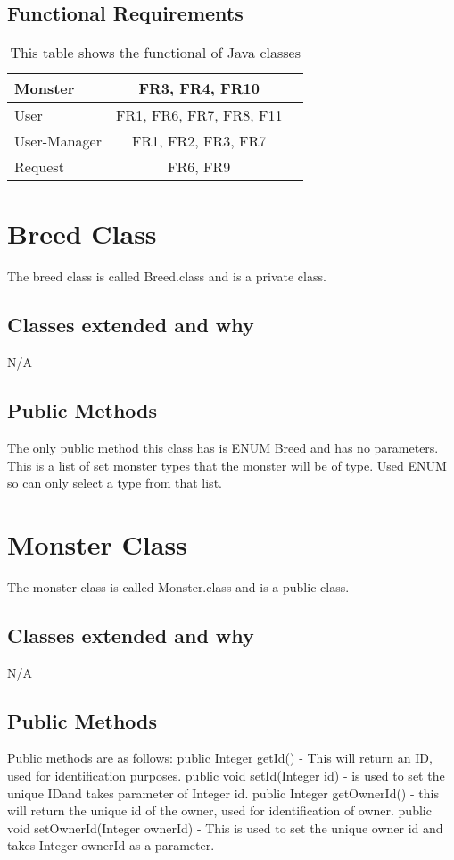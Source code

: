 \documentclass{project}
\begin{document}
\subsection{Functional Requirements}
\begin{table}[!h]
\centering
\begin{tabular}{|l|c|r}
\hline
Monster & FR3, FR4, FR10 \\ \hline
User & FR1, FR6, FR7, FR8, F11 \\ \hline
User-Manager & FR1, FR2, FR3, FR7 \\ \hline
Request & FR6, FR9 \\ \hline
\end{tabular}
\caption{This table shows the functional of Java classes}
\label{tab:myfirsttable}
\end{table} 

\section{Breed Class}
The breed class is called Breed.class and is a private class.
\subsection{Classes extended and why}
N/A
\subsection{Public Methods} 
The only public method this class has is ENUM Breed and has no parameters. This is a list of set monster types that the monster will be of type. Used ENUM so can only select a type from that list.

\section{Monster Class}
The monster class is called Monster.class and is a public class.
\subsection{Classes extended and why}
N/A
\subsection{Public Methods}
Public methods are as follows:        
public Integer getId() - This will return an ID, used for identification purposes. public void setId(Integer id) - is used to set the unique IDand takes parameter of Integer id. public Integer getOwnerId() - this will return the unique id of the owner, used for identification of owner. public void setOwnerId(Integer ownerId) - This is used to set the unique owner id and takes Integer ownerId as a parameter.
\end{document}
